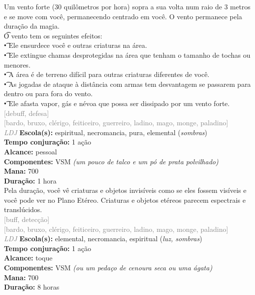 \documentclass{RPG_Adventure}[2021/10/20]
\begin{document}
{\normalsize Um vento forte (30 quilômetros por hora) sopra a sua volta num raio de 3 metros e se move com você, permanecendo centrado em você. O vento permanece pela duração da magia.\\\t O vento tem os seguintes efeitos:\\\t • Ele ensurdece você e outras criaturas na área.\\\t • Ele extingue chamas desprotegidas na área que tenham o tamanho de tochas ou menores.\\\t • A área é de terreno difícil para outras criaturas diferentes de você.\\\t • As jogadas de ataque à distância com armas tem desvantagem se passarem para dentro ou para fora do vento.\\\t • Ele afasta vapor, gás e névoa que possa ser dissipado por um vento forte.\\}
{\scriptsize \textcolor{gray}{[debuff, defesa]\\}}
{\scriptsize \textcolor{gray}{[bardo, bruxo, clérigo, feiticeiro, guerreiro, ladino, mago, monge, paladino]\\}}
{\tiny \textcolor{gray}{\textit{LDJ}}}
{\small \t \textbf{Escola(s):} espiritual, necromancia, pura, elemental (\textit{sombras})\\\t \textbf{Tempo conjuração:} 1 ação\\\t \textbf{Alcance:} pessoal\\\t \textbf{Componentes:} VSM \textit{(um pouco de talco e um pó de prata polvilhado)}\\\t \textbf{Mana:} 700\\\t \textbf{Duração:} 1 hora\\}
{\normalsize Pela duração, você vê criaturas e objetos invisíveis como se eles fossem visíveis e você pode ver no Plano Etéreo. Criaturas e objetos etéreos parecem espectrais e translúcidos.\\}
{\scriptsize \textcolor{gray}{[buff, detecção]\\}}
{\scriptsize \textcolor{gray}{[bardo, bruxo, clérigo, feiticeiro, guerreiro, ladino, mago, monge, paladino]\\}}
{\tiny \textcolor{gray}{\textit{LDJ}}}
{\small \t \textbf{Escola(s):} elemental, necromancia, espiritual (\textit{luz, sombras})\\\t \textbf{Tempo conjuração:} 1 ação\\\t \textbf{Alcance:} toque\\\t \textbf{Componentes:} VSM \textit{(ou um pedaço de cenoura seca ou uma ágata)}\\\t \textbf{Mana:} 700\\\t \textbf{Duração:} 8 horas\\}
\end{document}
